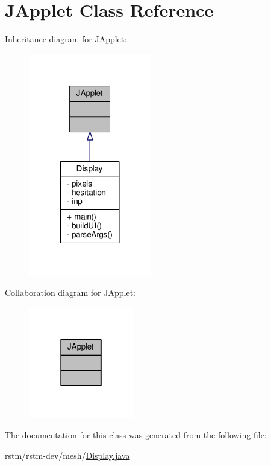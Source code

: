 \hypertarget{classJApplet}{\section{J\-Applet Class Reference}
\label{classJApplet}
}


Inheritance diagram for J\-Applet\-:
\nopagebreak
\begin{figure}[H]
\begin{center}
\leavevmode
\includegraphics[width=152pt]{classJApplet__inherit__graph}
\end{center}
\end{figure}


Collaboration diagram for J\-Applet\-:
\nopagebreak
\begin{figure}[H]
\begin{center}
\leavevmode
\includegraphics[width=130pt]{classJApplet__coll__graph}
\end{center}
\end{figure}


The documentation for this class was generated from the following file\-:\begin{DoxyCompactItemize}
\item 
rstm/rstm-\/dev/mesh/\hyperlink{Display_8java}{Display.\-java}\end{DoxyCompactItemize}
